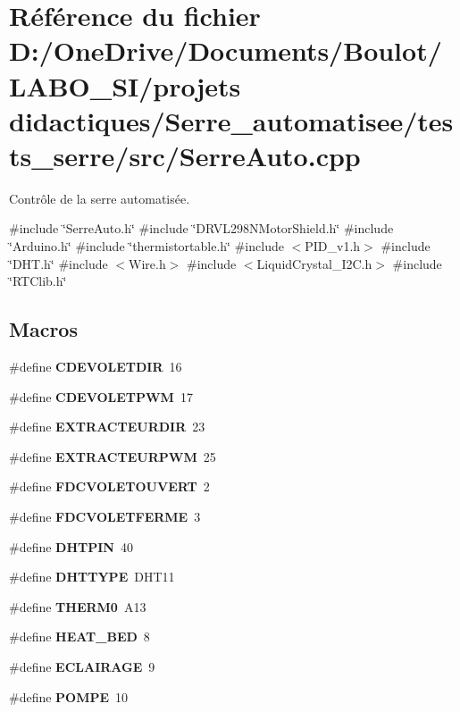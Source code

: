 \section{Référence du fichier D\+:/\+One\+Drive/\+Documents/\+Boulot/\+L\+A\+B\+O\+\_\+\+S\+I/projets didactiques/\+Serre\+\_\+automatisee/tests\+\_\+serre/src/\+Serre\+Auto.cpp}
\label{_serre_auto_8cpp}


Contrôle de la serre automatisée.  


{\ttfamily \#include \char`\"{}Serre\+Auto.\+h\char`\"{}}\newline
{\ttfamily \#include \char`\"{}D\+R\+V\+L298\+N\+Motor\+Shield.\+h\char`\"{}}\newline
{\ttfamily \#include \char`\"{}Arduino.\+h\char`\"{}}\newline
{\ttfamily \#include \char`\"{}thermistortable.\+h\char`\"{}}\newline
{\ttfamily \#include $<$P\+I\+D\+\_\+v1.\+h$>$}\newline
{\ttfamily \#include \char`\"{}D\+H\+T.\+h\char`\"{}}\newline
{\ttfamily \#include $<$Wire.\+h$>$}\newline
{\ttfamily \#include $<$Liquid\+Crystal\+\_\+\+I2\+C.\+h$>$}\newline
{\ttfamily \#include \char`\"{}R\+T\+Clib.\+h\char`\"{}}\newline
\subsection*{Macros}
\begin{DoxyCompactItemize}
\item 
\#define \textbf{ C\+D\+E\+V\+O\+L\+E\+T\+D\+IR}~16
\item 
\#define \textbf{ C\+D\+E\+V\+O\+L\+E\+T\+P\+WM}~17
\item 
\#define \textbf{ E\+X\+T\+R\+A\+C\+T\+E\+U\+R\+D\+IR}~23
\item 
\#define \textbf{ E\+X\+T\+R\+A\+C\+T\+E\+U\+R\+P\+WM}~25
\item 
\#define \textbf{ F\+D\+C\+V\+O\+L\+E\+T\+O\+U\+V\+E\+RT}~2
\item 
\#define \textbf{ F\+D\+C\+V\+O\+L\+E\+T\+F\+E\+R\+ME}~3
\item 
\#define \textbf{ D\+H\+T\+P\+IN}~40
\item 
\#define \textbf{ D\+H\+T\+T\+Y\+PE}~D\+H\+T11
\item 
\#define \textbf{ T\+H\+E\+R\+M0}~A13
\item 
\#define \textbf{ H\+E\+A\+T\+\_\+\+B\+ED}~8
\item 
\#define \textbf{ E\+C\+L\+A\+I\+R\+A\+GE}~9
\item 
\#define \textbf{ P\+O\+M\+PE}~10
\end{DoxyCompactItemize}
